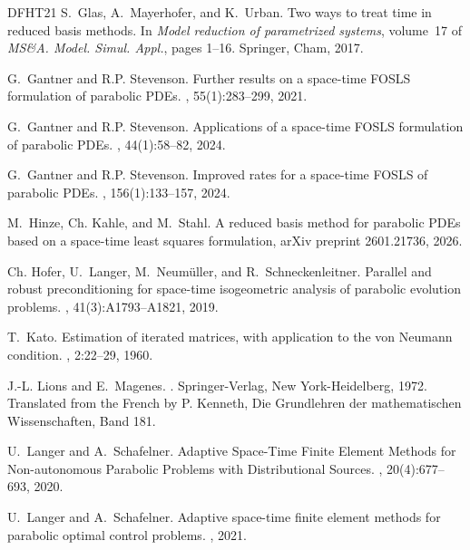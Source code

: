 \documentclass{amsart}
\numberwithin{equation}{section}
\newcommand{\1}{\mathbb 1}
\begin{document}
\begin{thebibliography}{DFHT21}
S.~Glas, A.~Mayerhofer, and K.~Urban.
\newblock Two ways to treat time in reduced basis methods.
\newblock In {\em Model reduction of parametrized systems}, volume~17 of {\em
  MS\&A. Model. Simul. Appl.}, pages 1--16. Springer, Cham, 2017.

G.~Gantner and R.P. Stevenson.
\newblock Further results on a space-time {FOSLS} formulation of parabolic
  {PDE}s.
, 55(1):283--299, 2021.

G.~Gantner and R.P. Stevenson.
\newblock Applications of a space-time {FOSLS} formulation of parabolic {PDEs}.
, 44(1):58--82, 2024.

G.~Gantner and R.P. Stevenson.
\newblock Improved rates for a space-time {FOSLS} of parabolic {PDE}s.
, 156(1):133--157, 2024.

M.~Hinze, Ch. Kahle, and M.~Stahl.
\newblock A reduced basis method for parabolic PDEs based on a space-time least
  squares formulation, arXiv preprint 2601.21736, 2026.

Ch. Hofer, U.~Langer, M.~Neum\"{u}ller, and R.~Schneckenleitner.
\newblock Parallel and robust preconditioning for space-time isogeometric
  analysis of parabolic evolution problems.
, 41(3):A1793--A1821, 2019.

T.~Kato.
\newblock Estimation of iterated matrices, with application to the von
  {N}eumann condition.
, 2:22--29, 1960.

J.-L. Lions and E.~Magenes.
.
\newblock Springer-Verlag, New York-Heidelberg, 1972.
\newblock Translated from the French by P. Kenneth, Die Grundlehren der
  mathematischen Wissenschaften, Band 181.

U.~Langer and A.~Schafelner.
\newblock Adaptive {S}pace-{T}ime {F}inite {E}lement {M}ethods for
  {N}on-autonomous {P}arabolic {P}roblems with {D}istributional {S}ources.
, 20(4):677--693, 2020.

U.~Langer and A.~Schafelner.
\newblock Adaptive space-time finite element methods for parabolic optimal
  control problems.
, 2021.


\end{thebibliography}
\end{document}
